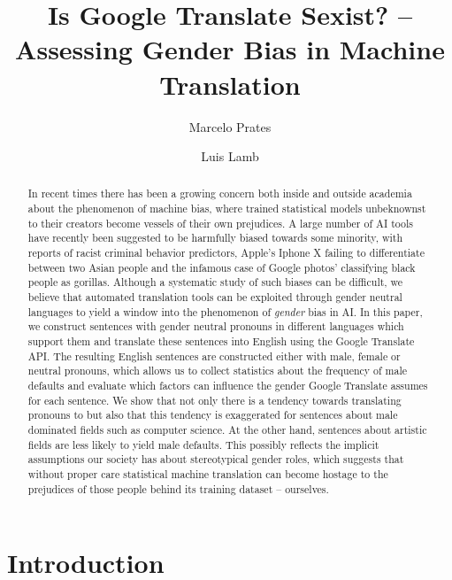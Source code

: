 \documentclass{article}
\title{Is Google Translate Sexist? -- Assessing Gender Bias in Machine Translation}
\author{Marcelo Prates \and Luis Lamb}
\begin{document}
\maketitle

\begin{abstract}
In recent times there has been a growing concern both inside and outside academia about the phenomenon of machine bias, where trained statistical models unbeknownst to their creators become vessels of their own prejudices. A large number of AI tools have recently been suggested to be harmfully biased towards some minority, with reports of racist criminal behavior predictors, Apple's Iphone X failing to differentiate between two Asian people and the infamous case of Google photos' classifying black people as gorillas. Although a systematic study of such biases can be difficult, we believe that automated translation tools can be exploited through gender neutral languages to yield a window into the phenomenon of \emph{gender} bias in AI. In this paper, we construct sentences with gender neutral pronouns in different languages which support them and translate these sentences into English using the Google Translate API. The resulting English sentences are constructed either with male, female or neutral pronouns, which allows us to collect statistics about the frequency of male defaults and evaluate which factors can influence the gender Google Translate assumes for each sentence. We show that not only there is a tendency towards translating pronouns to  but also that this tendency is exaggerated for sentences about male dominated fields such as computer science. At the other hand, sentences about artistic fields are less likely to yield male defaults. This possibly reflects the implicit assumptions our society has about stereotypical gender roles, which suggests that without proper care statistical machine translation can become hostage to the prejudices of those people behind its training dataset -- ourselves.
\end{abstract}

\section{Introduction}
\end{document}
